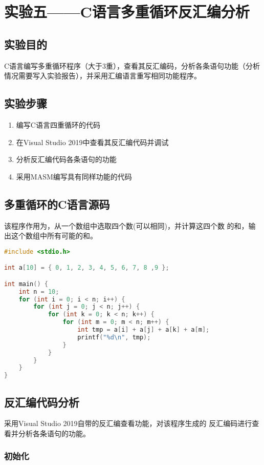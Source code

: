 \chapter{实验五——C语言多重循环反汇编分析}

\section{实验目的}
C语言编写多重循环程序（大于3重），查看其反汇编码，分析各条语句功能（分析情况需要写入实验报告），并采用汇编语言重写相同功能程序。

\section{实验步骤}
\begin{enumerate}
    \item 编写C语言四重循环的代码
    \item 在Visual Studio 2019中查看其反汇编代码并调试
    \item 分析反汇编代码各条语句的功能
    \item 采用MASM编写具有同样功能的代码
\end{enumerate}

\section{多重循环的C语言源码}
该程序作用为，从一个数组中选取四个数(可以相同)，并计算这四个数
的和，输出这个数组中所有可能的和。

\begin{lstlisting}[language=C]
#include <stdio.h>

int a[10] = { 0, 1, 2, 3, 4, 5, 6, 7, 8 ,9 };

int main() {
    int n = 10;
    for (int i = 0; i < n; i++) {
        for (int j = 0; j < n; j++) {
            for (int k = 0; k < n; k++) {
                for (int m = 0; m < n; m++) {
                    int tmp = a[i] + a[j] + a[k] + a[m];
                    printf("%d\n", tmp);
                }
            }
        }
    }
}
\end{lstlisting}

\section{反汇编代码分析}
采用Visual Studio 2019自带的反汇编查看功能，对该程序生成的
反汇编码进行查看并分析各条语句的功能。

\subsection{初始化}

